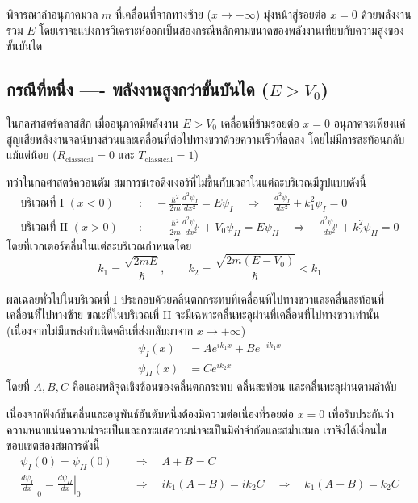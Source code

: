 พิจารณาลำอนุภาคมวล $m$ ที่เคลื่อนที่จากทางซ้าย ($x \to -\infty$) มุ่งหน้าสู่รอยต่อ $x = 0$ ด้วยพลังงานรวม $E$ โดยเราจะแบ่งการวิเคราะห์ออกเป็นสองกรณีหลักตามขนาดของพลังงานเทียบกับความสูงของขั้นบันได

\subsection{กรณีที่หนึ่ง ---- พลังงานสูงกว่าขั้นบันได ($E > V_0$)}
ในกลศาสตร์คลาสสิก เมื่ออนุภาคมีพลังงาน $E > V_0$ เคลื่อนที่ข้ามรอยต่อ $x = 0$ อนุภาคจะเพียงแค่สูญเสียพลังงานจลน์บางส่วนและเคลื่อนที่ต่อไปทางขวาด้วยความเร็วที่ลดลง โดยไม่มีการสะท้อนกลับแม้แต่น้อย ($R_{\text{classical}} = 0$ และ $T_{\text{classical}} = 1$)

ทว่าในกลศาสตร์ควอนตัม สมการชเรอดิงเงอร์ที่ไม่ขึ้นกับเวลาในแต่ละบริเวณมีรูปแบบดังนี้
\begin{align}
\text{บริเวณที่ I } (x < 0) \quad &\colon \quad -\frac{\hbar^2}{2m}\frac{d^2\psi_I}{dx^2} = E\psi_I \quad \Longrightarrow \quad \frac{d^2\psi_I}{dx^2} + k_1^2\psi_I = 0 \\
\text{บริเวณที่ II } (x > 0) \quad &\colon \quad -\frac{\hbar^2}{2m}\frac{d^2\psi_{II}}{dx^2} + V_0\psi_{II} = E\psi_{II} \quad \Longrightarrow \quad \frac{d^2\psi_{II}}{dx^2} + k_2^2\psi_{II} = 0
\end{align}
โดยที่เวกเตอร์คลื่นในแต่ละบริเวณกำหนดโดย
\begin{equation}
k_1 = \frac{\sqrt{2mE}}{\hbar}, \qquad k_2 = \frac{\sqrt{2m(E - V_0)}}{\hbar} < k_1
\end{equation}

ผลเฉลยทั่วไปในบริเวณที่ I ประกอบด้วยคลื่นตกกระทบที่เคลื่อนที่ไปทางขวาและคลื่นสะท้อนที่เคลื่อนที่ไปทางซ้าย ขณะที่ในบริเวณที่ II จะมีเฉพาะคลื่นทะลุผ่านที่เคลื่อนที่ไปทางขวาเท่านั้น (เนื่องจากไม่มีแหล่งกำเนิดคลื่นที่ส่งกลับมาจาก $x \to +\infty$)
\begin{align}
\psi_I(x) &= A e^{ik_1 x} + B e^{-ik_1 x} \\
\psi_{II}(x) &= C e^{ik_2 x}
\end{align}
โดยที่ $A, B, C$ คือแอมพลิจูดเชิงซ้อนของคลื่นตกกระทบ คลื่นสะท้อน และคลื่นทะลุผ่านตามลำดับ

เนื่องจากฟังก์ชันคลื่นและอนุพันธ์อันดับหนึ่งต้องมีความต่อเนื่องที่รอยต่อ $x = 0$ เพื่อรับประกันว่าความหนาแน่นความน่าจะเป็นและกระแสความน่าจะเป็นมีค่าจำกัดและสม่ำเสมอ เราจึงได้เงื่อนไขขอบเขตสองสมการดังนี้
\begin{align}
\psi_I(0) = \psi_{II}(0) \quad &\Longrightarrow \quad A + B = C \\
\left.\frac{d\psi_I}{dx}\right|_{0} = \left.\frac{d\psi_{II}}{dx}\right|_{0} \quad &\Longrightarrow \quad ik_1(A - B) = ik_2 C \quad \Longrightarrow \quad k_1(A - B) = k_2 C
\end{align}

